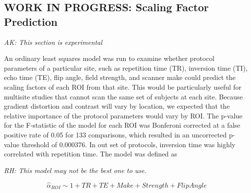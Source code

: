 \subsection{WORK IN PROGRESS: Scaling Factor Prediction}

\textit{AK: This section is experimental}

An ordinary least squares model was run to examine whether protocol parameters of a particular site, such as repetition time (TR), inversion time (TI), echo time (TE), flip angle, field strength, and scanner make could predict the scaling factors of each ROI from that site. This would be particularly useful for multisite studies that cannot scan the same set of subjects at each site. Because gradient distortion and contrast will vary by location, we expected that the relative importance of the protocol parameters would vary by ROI. The p-value for the F-statistic of the model for each ROI was Bonferoni corrected at a false positive rate of 0.05 for 133 comparisons, which resulted in an uncorrected p-value threshold of 0.000376. In out set of protocols, inversion time was highly correlated with repetition time. The model was defined as

\textit{RH: This model may not be the best one to use.} 

\begin{equation}
\hat{\alpha}_{ROI} \sim 1 + TR+ TE + Make + Strength + FlipAngle
\end{equation}
